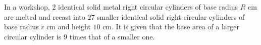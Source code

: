 \question
In a workshop, $2$ identical solid metal right circular cylinders of base radius $R\text{ cm}$ are melted and recast into $27$ smaller identical solid right circular cylinders of base radius $r\text{ cm}$ and height $10\text{ cm}$. It is given that the base area of a larger circular cylinder is $9$ times that of a smaller one.

